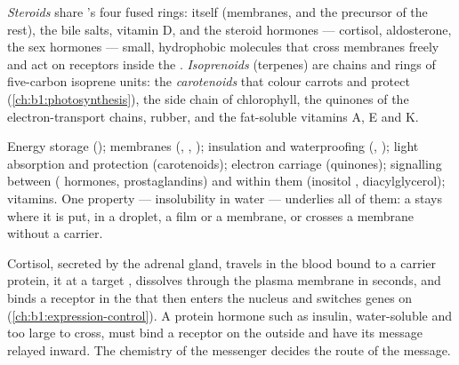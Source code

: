 \begin{definition}\label{def:b1:lipids:steroids}
\emph{Steroids} share 's four fused rings:
 itself (membranes, and the precursor of the rest), the bile
salts, vitamin D, and the steroid hormones --- cortisol, aldosterone,
the sex hormones --- small, hydrophobic molecules that cross membranes
freely and act on receptors inside the . \emph{Isoprenoids}
(terpenes) are chains and rings of five-carbon isoprene units: the
\emph{carotenoids} that colour carrots and protect 
(\cref{ch:b1:photosynthesis}), the side chain of chlorophyll, the
quinones of the electron-transport chains, rubber, and the fat-soluble
vitamins A, E and K.
\end{definition}

\begin{proposition}\label{prop:b1:lipids:functions}
Energy storage (); membranes (, ,
); insulation and waterproofing (, ); light absorption
and protection (carotenoids); electron carriage (quinones); signalling
between  ( hormones, prostaglandins) and within them
(inositol , diacylglycerol); vitamins. One property ---
insolubility in water --- underlies all of them: a  stays where it
is put, in a droplet, a film or a membrane, or crosses a membrane
without a carrier.
\end{proposition}

\begin{example}\label{ex:b1:lipids:steroidhormone}
Cortisol, secreted by the adrenal gland, travels in the blood bound to a
carrier protein,  it at a target , dissolves through the
plasma membrane in seconds, and binds a receptor in the  that
then enters the nucleus and switches genes on
(\cref{ch:b1:expression-control}). A protein hormone such as insulin,
water-soluble and too large to cross, must bind a receptor on the
outside and have its message relayed inward. The chemistry of the
messenger decides the route of the message.
\end{example}

